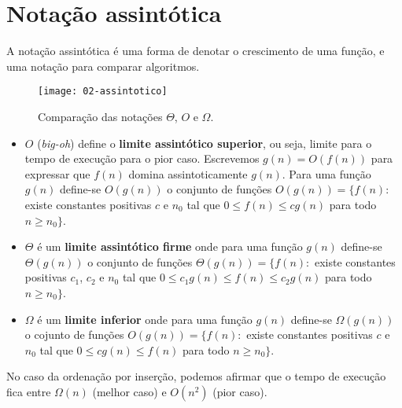 \section{Notação assintótica}

A notação assintótica é uma forma de denotar o crescimento de uma função,
e uma notação para comparar algoritmos.
%
\begin{figure}[ht]
\centering
\texttt{[image: 02-assintotico]}
\caption{Comparação das notações $\Theta$, $O$ e $\Omega$.}
\label{aula02:fig:assintotico}
\end{figure}

\begin{itemize}
\item $O$ (\emph{big-oh}) define o {\bf limite assintótico superior}, ou seja, 
limite para o tempo de execução para o pior caso. Escrevemos $g(n) = O(f(n))$ para
expressar que $f(n)$ domina assintoticamente $g(n)$. Para
uma função $g(n)$ define-se $O(g(n))$ o conjunto de funções 
$O(g(n)) = \{f(n):$ existe constantes positivas $c$ e $n_0$ tal que $0 \leq f(n) \leq c g(n)$ 
para todo $n \geq n_0\}$.

\item $\Theta$ é um {\bf limite assintótico firme} onde 
para uma função $g(n)$ define-se $\Theta(g(n))$ o conjunto de funções 
$\Theta(g(n)) = \{f(n):$ existe constantes positivas $c_1$, $c_2$ e $n_0$ tal que 
$0 \leq c_1 g(n) \leq f(n) \leq c_2 g(n)$ 
para todo $n \geq n_0\}$.

\item $\Omega$ é um {\bf limite inferior} onde para uma função $g(n)$ 
define-se $\Omega(g(n))$ o cojunto de funções
$O(g(n)) = \{f(n):$ existe constantes positivas $c$ e $n_0$ tal que $0 \leq c g(n) \leq f(n)$ 
para todo $n \geq n_0\}$.

\end{itemize}

No caso da ordenação por inserção, podemos afirmar que o tempo de execução fica entre
$\Omega(n)$ (melhor caso) e $O(n^2)$ (pior caso).


